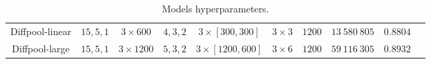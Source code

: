 \documentclass[switch, 11pt]{article}
\begin{document}
\begin{table}
\begin{center}
{\begin{tabular}{|c|c|c|c|c|c|c|c|c|c|}
                Diffpool-linear     & $15, 5, 1 $              & $3 \times 600$                      & $4, 3, 2$    & $3\times [300, 300]$                     & $3\times 3$                           & $1200$                      & $13\:580\:805$            & $0.8804$                  \\
                Diffpool-large      & $15, 5, 1 $              & $3 \times 1200$                     & $5, 3, 2$    & $3\times [1200, 600]$                    & $3\times 6$                           & $1200$                      & $59\:116\:305$            & $0.8932$                  \\
                \midrule
            \end{tabular}
        }
    \end{center}
    \caption{Models hyperparameters.}
    \label{tab:models}
\end{table}

\end{document}
